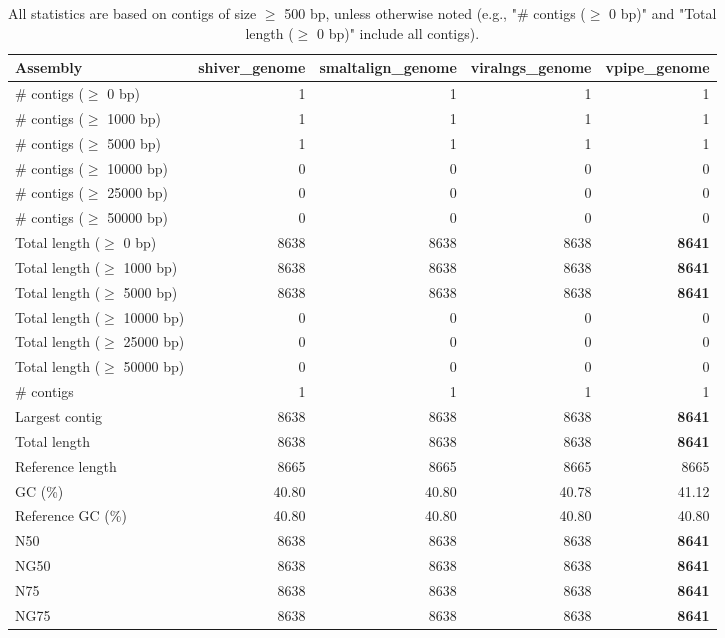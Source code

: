 \documentclass[12pt,a4paper]{article}
\begin{document}
\begin{table}[ht]
\begin{center}
\caption{All statistics are based on contigs of size $\geq$ 500 bp, unless otherwise noted (e.g., "\# contigs ($\geq$ 0 bp)" and "Total length ($\geq$ 0 bp)" include all contigs).}
\begin{tabular}{|l*{4}{|r}|}
\hline
Assembly & shiver\_genome & smaltalign\_genome & viralngs\_genome & vpipe\_genome \\ \hline
\# contigs ($\geq$ 0 bp) & 1 & 1 & 1 & 1 \\ \hline
\# contigs ($\geq$ 1000 bp) & 1 & 1 & 1 & 1 \\ \hline
\# contigs ($\geq$ 5000 bp) & 1 & 1 & 1 & 1 \\ \hline
\# contigs ($\geq$ 10000 bp) & 0 & 0 & 0 & 0 \\ \hline
\# contigs ($\geq$ 25000 bp) & 0 & 0 & 0 & 0 \\ \hline
\# contigs ($\geq$ 50000 bp) & 0 & 0 & 0 & 0 \\ \hline
Total length ($\geq$ 0 bp) & 8638 & 8638 & 8638 & {\bf 8641} \\ \hline
Total length ($\geq$ 1000 bp) & 8638 & 8638 & 8638 & {\bf 8641} \\ \hline
Total length ($\geq$ 5000 bp) & 8638 & 8638 & 8638 & {\bf 8641} \\ \hline
Total length ($\geq$ 10000 bp) & 0 & 0 & 0 & 0 \\ \hline
Total length ($\geq$ 25000 bp) & 0 & 0 & 0 & 0 \\ \hline
Total length ($\geq$ 50000 bp) & 0 & 0 & 0 & 0 \\ \hline
\# contigs & 1 & 1 & 1 & 1 \\ \hline
Largest contig & 8638 & 8638 & 8638 & {\bf 8641} \\ \hline
Total length & 8638 & 8638 & 8638 & {\bf 8641} \\ \hline
Reference length & 8665 & 8665 & 8665 & 8665 \\ \hline
GC (\%) & 40.80 & 40.80 & 40.78 & 41.12 \\ \hline
Reference GC (\%) & 40.80 & 40.80 & 40.80 & 40.80 \\ \hline
N50 & 8638 & 8638 & 8638 & {\bf 8641} \\ \hline
NG50 & 8638 & 8638 & 8638 & {\bf 8641} \\ \hline
N75 & 8638 & 8638 & 8638 & {\bf 8641} \\ \hline
NG75 & 8638 & 8638 & 8638 & {\bf 8641} \\ \hline

\end{tabular}
\end{center}
\end{table}
\end{document}
